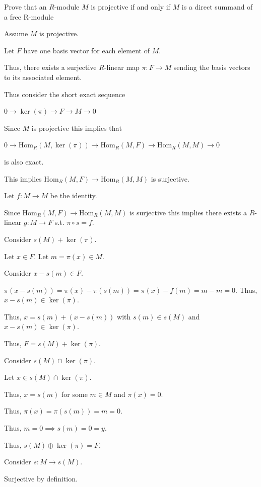 \documentclass[12pt, letterpaper]{article}
\begin{document}
\begin{subproblem}{}
    Prove that an $R$-module $M$ is projective if and only if $M$ is a direct summand of a
free R-module
\end{subproblem}
\begin{problemproof}
    Assume $M$ is projective.

    Let $F$ have one basis vector for each element of $M$.

    Thus, there exists a surjective $R$-linear map $\pi : F \to M$ sending the basis vectors to its associated element.

    Thus consider the short exact sequence

    $0 \to \ker(\pi) \to F \to M \to 0$

    Since $M$ is projective this implies that

    $0 \to \mathrm{Hom}_R(M,\ker(\pi)) \to \mathrm{Hom}_R(M,F) \to \mathrm{Hom}_R(M,M) \to 0$

    is also exact.

    This implies $\mathrm{Hom}_R(M,F) \to \mathrm{Hom}_R(M,M)$ is surjective.

    Let $f : M \to M$ be the identity.

    Since $\mathrm{Hom}_R(M,F) \to \mathrm{Hom}_R(M,M)$ is surjective this implies 
    there exists a $R$-linear $g : M \to F$ s.t. $\pi \circ s = f$.


    Consider $s(M) + \ker(\pi)$.

    Let $x \in F$. Let $m = \pi(x) \in M$.

    Consider $x-s(m) \in F$.

    $\pi(x-s(m))=\pi(x)-\pi(s(m))=\pi(x)-f(m)=m-m=0$. Thus, $x-s(m) \in \ker(\pi)$.

    Thus, $x=s(m)+(x-s(m))$ with $s(m) \in s(M)$ and $x-s(m) \in \ker(\pi)$.

    Thus, $F=s(M) + \ker(\pi)$.

    Consider $s(M) \cap \ker(\pi)$.

    Let $x \in s(M) \cap \ker(\pi)$.

    Thus, $x=s(m)$ for some $m \in M$ and $\pi(x)=0$.

    Thus, $\pi(x)=\pi(s(m))=m=0$.

    Thus, $m=0 \implies s(m)=0=y$.

    Thus, $s(M) \oplus \ker(\pi) = F$.

    Consider $s : M \to s(M)$.

    Surjective by definition.


\end{problemproof}
\end{document}
